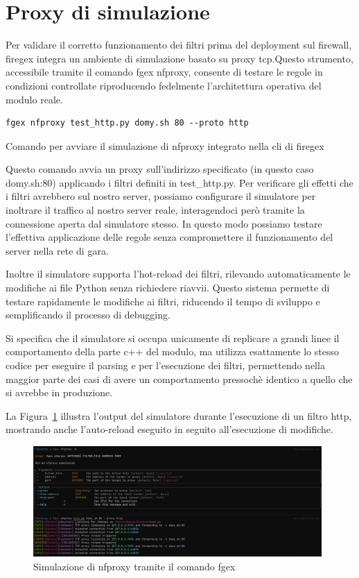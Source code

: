 \section{Proxy di simulazione}

Per validare il corretto funzionamento dei filtri prima del deployment sul firewall, firegex integra un ambiente di simulazione basato su proxy \gls{tcp}.\@ Questo strumento, accessibile tramite il comando fgex \gls{nfproxy}, consente di testare le regole in condizioni controllate riproducendo fedelmente l'architettura operativa del modulo reale.
\begin{listing}[H]
\begin{verbatim}
fgex nfproxy test_http.py domy.sh 80 --proto http
\end{verbatim}
\vspace{-1em}
\caption{Comando per avviare il simulazione di nfproxy integrato nella \gls{cli} di firegex}\label{lst:nfproxy_sim_cmd}
\end{listing}

Questo comando avvia un proxy sull'indirizzo specificato (in questo caso domy.sh:80) applicando i filtri definiti in test\_http.py.
Per verificare gli effetti che i filtri avrebbero sul nostro server, possiamo configurare il simulatore per inoltrare il traffico al nostro server reale, interagendoci però tramite la connessione aperta dal simulatore stesso. In questo modo possiamo testare l'effettiva applicazione delle regole senza compromettere il funzionamento del server nella rete di gara.

Inoltre il simulatore supporta l'hot-reload dei filtri, rilevando automaticamente le modifiche ai file Python senza richiedere riavvii. Questo sistema permette di testare rapidamente le modifiche ai filtri, riducendo il tempo di sviluppo e semplificando il processo di debugging.

Si specifica che il simulatore si occupa unicamente di replicare a grandi linee il comportamento della parte c++ del modulo, ma utilizza esattamente lo stesso codice per eseguire il parsing e per l'esecuzione dei filtri, permettendo nella maggior parte dei casi di avere un comportamento pressochè identico a quello che si avrebbe in produzione.

La Figura~\ref{fig:nfproxy_sim} illustra l'output del simulatore durante l'esecuzione di un filtro \gls{http}, mostrando anche l'auto-reload eseguito in seguito all'esecuzione di modifiche.

\begin{figure}[H]
    \centering
    \includegraphics[width=0.98\textwidth]{images/chapter3/nfproxy_sim.png}
    \caption{Simulazione di \gls{nfproxy} tramite il comando fgex}\label{fig:nfproxy_sim}
\end{figure}

